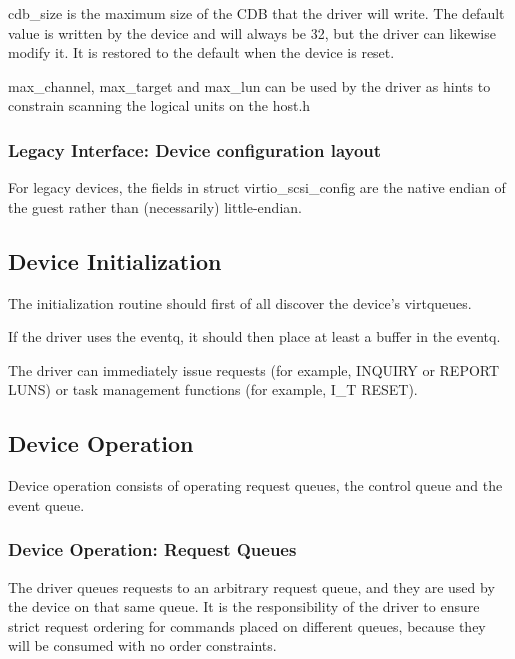   cdb_size is the maximum size of the CDB that the driver will
    write. The default value is written by the device and will
    always be 32, but the driver can likewise modify it. It is
    restored to the default when the device is reset.

  max_channel, max_target and max_lun can be used by the driver
    as hints to constrain scanning the logical units on the
    host.h

\subsubsection{Legacy Interface: Device configuration layout}\label{sec:Device Types / SCSI Host Device / Device configuration layout / Legacy Interface: Device configuration layout}
For legacy devices, the fields in struct virtio_scsi_config are the
native endian of the guest rather than (necessarily) little-endian.

\subsection{Device Initialization}\label{sec:Device Types / SCSI Host Device / Device Initialization}

The initialization routine should first of all discover the
device's virtqueues.

If the driver uses the eventq, it should then place at least a
buffer in the eventq.

The driver can immediately issue requests (for example, INQUIRY
or REPORT LUNS) or task management functions (for example, I_T
RESET).

\subsection{Device Operation}\label{sec:Device Types / SCSI Host Device / Device Operation}

Device operation consists of operating request queues, the control
queue and the event queue.

\subsubsection{Device Operation: Request Queues}\label{sec:Device Types / SCSI Host Device / Device Operation / Device Operation: Request Queues}

The driver queues requests to an arbitrary request queue, and
they are used by the device on that same queue. It is the
responsibility of the driver to ensure strict request ordering
for commands placed on different queues, because they will be
consumed with no order constraints.

